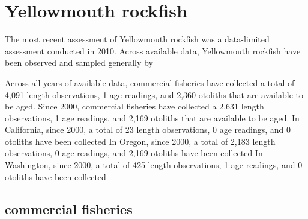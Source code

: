 \documentclass[11pt,
  english,
  letterpaper,
]{article}
\begin{document}

\hypertarget{yellowmouth-rockfish}{%
\section{Yellowmouth rockfish}\label{yellowmouth-rockfish}}

\leavevmode\tagmcend\tagstructend


The most recent assessment of Yellowmouth rockfish was a data-limited assessment conducted in 2010. Across available data, Yellowmouth rockfish have been observed and sampled generally by

\leavevmode\tagmcend\tagstructend\par


Across all years of available data, commercial fisheries have collected a total of 4,091 length observations, 1 age readings, and 2,360 otoliths that are available to be aged. Since 2000, commercial fisheries have collected a 2,631 length observations, 1 age readings, and 2,169 otoliths that are available to be aged. In California, since 2000, a total of 23 length observations, 0 age readings, and 0 otoliths have been collected In Oregon, since 2000, a total of 2,183 length observations, 0 age readings, and 2,169 otoliths have been collected In Washington, since 2000, a total of 425 length observations, 1 age readings, and 0 otoliths have been collected

\leavevmode\tagmcend\tagstructend\par


\hypertarget{commercial-fisheries-59}{%
\subsection{commercial fisheries}\label{commercial-fisheries-59}}

\leavevmode\tagmcend\tagstructend


\begingroup\fontsize{10}{12}\selectfont \begingroup\fontsize{10}{12}\selectfont

\leavevmode\tagmcend\tagstructend\par
\end{document}
